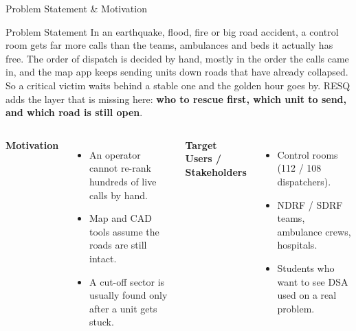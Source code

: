 \documentclass[aspectratio=169,11pt]{beamer}
\begin{document}
\begin{frame}[shrink=12]{Problem Statement \& Motivation}
\begin{block}{Problem Statement}
\small In an earthquake, flood, fire or big road accident, a control room gets far more calls than the
teams, ambulances and beds it actually has free. The order of dispatch is decided by hand, mostly in the
order the calls came in, and the map app keeps sending units down roads that have already collapsed. So a
critical victim waits behind a stable one and the golden hour goes by. RESQ adds the layer that is missing
here: \textbf{who to rescue first, which unit to send, and which road is still open}.
\end{block}
\vspace{1mm}
\begin{columns}[T,totalwidth=\textwidth]
\textbf{\color{GEUBlue}Motivation}
\begin{itemize}\itemsep2pt
\small
\item An operator cannot re-rank hundreds of live calls by hand.
\item Map and CAD tools assume the roads are still intact.
\item A cut-off sector is usually found only after a unit gets stuck.
\end{itemize}
\textbf{\color{GEUBlue}Target Users / Stakeholders}
\begin{itemize}\itemsep2pt
\small
\item Control rooms (112 / 108 dispatchers).
\item NDRF / SDRF teams, ambulance crews, hospitals.
\item Students who want to see DSA used on a real problem.
\end{itemize}
\end{columns}
\end{frame}
\end{document}
